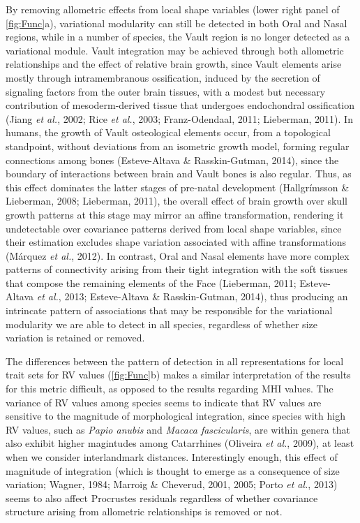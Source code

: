 \documentclass[12pt,twoside]{report}
\begin{document}
By removing allometric effects from local shape variables (lower right
panel of \autoref{fig:Func}a), variational modularity can still be
detected in both Oral and Nasal regions, while in a number of species,
the Vault region is no longer detected as a variational module. Vault
integration may be achieved through both allometric relationships and
the effect of relative brain growth, since Vault elements arise mostly
through intramembranous ossification, induced by the secretion of
signaling factors from the outer brain tissues, with a modest but
necessary contribution of mesoderm-derived tissue that undergoes
endochondral ossification (Jiang \emph{et al.}, 2002; Rice \emph{et
al.}, 2003; Franz-Odendaal, 2011; Lieberman, 2011). In humans, the
growth of Vault osteological elements occur, from a topological
standpoint, without deviations from an isometric growth model, forming
regular connections among bones (Esteve-Altava \& Rasskin-Gutman, 2014),
since the boundary of interactions between brain and Vault bones is also
regular. Thus, as this effect dominates the latter stages of pre-natal
development (Hallgrímsson \& Lieberman, 2008; Lieberman, 2011), the
overall effect of brain growth over skull growth patterns at this stage
may mirror an affine transformation, rendering it undetectable over
covariance patterns derived from local shape variables, since their
estimation excludes shape variation associated with affine
transformations (Márquez \emph{et al.}, 2012). In contrast, Oral and
Nasal elements have more complex patterns of connectivity arising from
their tight integration with the soft tissues that compose the remaining
elements of the Face (Lieberman, 2011; Esteve-Altava \emph{et al.},
2013; Esteve-Altava \& Rasskin-Gutman, 2014), thus producing an
intrincate pattern of associations that may be responsible for the
variational modularity we are able to detect in all species, regardless
of whether size variation is retained or removed.

The differences between the pattern of detection in all representations
for local trait sets for RV values (\autoref{fig:Func}b) makes a similar
interpretation of the results for this metric difficult, as opposed to
the results regarding MHI values. The variance of RV values among
species seems to indicate that RV values are sensitive to the magnitude
of morphological integration, since species with high RV values, such as
\emph{Papio anubis} and \emph{Macaca fascicularis}, are within genera
that also exhibit higher magintudes among Catarrhines (Oliveira \emph{et
al.}, 2009), at least when we consider interlandmark distances.
Interestingly enough, this effect of magnitude of integration (which is
thought to emerge as a consequence of size variation; Wagner, 1984;
Marroig \& Cheverud, 2001, 2005; Porto \emph{et al.}, 2013) seems to
also affect Procrustes residuals regardless of whether covariance
structure arising from allometric relationships is removed or not.
\end{document}
